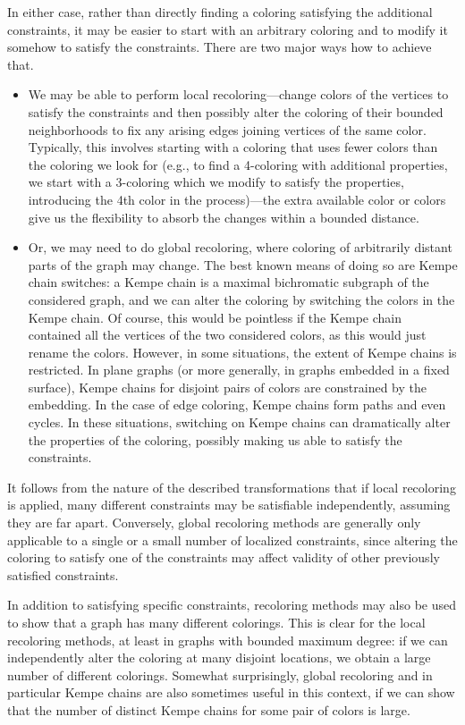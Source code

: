 \documentclass[12pt,twoside,openright,a4paper]{book}
\begin{document}
In either case, rather than directly finding a coloring satisfying the additional constraints,
it may be easier to start with an arbitrary coloring and to modify it somehow to satisfy the constraints.
There are two major ways how to achieve that.
\begin{itemize}
\item We may be able to perform local recoloring---change colors of the vertices to satisfy the constraints
and then possibly alter the coloring of their bounded neighborhoods to fix any arising edges joining vertices of the same color.
Typically, this involves starting with a coloring that uses fewer colors than the coloring we look for
(e.g., to find a 4-coloring with additional properties, we start with a $3$-coloring which we modify to
satisfy the properties, introducing the 4th color in the process)---the extra available color or colors give us the flexibility
to absorb the changes within a bounded distance.
\item Or, we may need to do global recoloring, where coloring of arbitrarily distant parts of the graph may change.
The best known means of doing so are Kempe chain switches: a Kempe chain is a maximal bichromatic subgraph of the considered
graph, and we can alter the coloring by switching the colors in the Kempe chain.  Of course, this would be pointless if
the Kempe chain contained all the vertices of the two considered colors, as this would just rename the colors.  However,
in some situations, the extent of Kempe chains is restricted.  In plane graphs (or more generally, in graphs embedded
in a fixed surface), Kempe chains for disjoint pairs of colors are constrained by the embedding.  In the case of edge coloring,
Kempe chains form paths and even cycles.  In these situations, switching on Kempe chains can dramatically alter the properties
of the coloring, possibly making us able to satisfy the constraints.
\end{itemize}
It follows from the nature of the described transformations that if local recoloring is applied, many different constraints
may be satisfiable independently, assuming they are far apart.  Conversely, global recoloring methods are generally only applicable
to a single or a small number of localized constraints, since altering the coloring to satisfy one of the constraints may
affect validity of other previously satisfied constraints.

In addition to satisfying specific constraints, recoloring methods may also be used to show that a graph has many different
colorings.  This is clear for the local recoloring methods, at least in graphs with bounded maximum degree: if we can independently alter
the coloring at many disjoint locations,
we obtain a large number of different colorings.  Somewhat surprisingly, global recoloring and in particular Kempe chains
are also sometimes useful in this context, if we can show that the number of distinct Kempe chains for some pair of colors is large.
\end{document}
